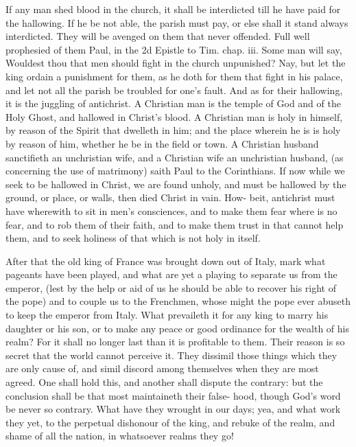 If any man shed blood in the church, it shall be interdicted
till he have paid for the hallowing. If he be not 
able, the parish must pay, or else shall it stand always interdicted.
They will be avenged on them that never 
offended. Full well prophesied of them Paul, in the 
2d Epistle to Tim. chap. iii. Some man will say, Wouldest 
thou that men should fight in the church unpunished? Nay, 
but let the king ordain a punishment for them, as he doth 
for them that fight in his palace, and let not all the parish 
be troubled for one's fault. And as for their hallowing, it 
is the juggling of antichrist. A Christian man is the 
temple of God and of the Holy Ghost, and hallowed in 
Christ's blood. A Christian man is holy in himself, by 
reason of the Spirit that dwelleth in him; and the place 
wherein he is is holy by reason of him, whether he be in 
the field or town. A Christian husband sanctifieth an 
unchristian wife, and a Christian wife an unchristian husband,
(as concerning the use of matrimony) saith Paul to 
the Corinthians. If now while we seek to be hallowed in 
Christ, we are found unholy, and must be hallowed by the 
ground, or place, or walls, then died Christ in vain. How- 
beit, antichrist must have wherewith to sit in men's consciences,
and to make them fear where is no fear, and 
to rob them of their faith, and to make them trust in 
that cannot help them, and to seek holiness of that which 
is not holy in itself. 

After that the old king of France was brought down out 
of Italy, mark what pageants have been played, and what 
are yet a playing to separate us from the emperor, (lest by 
the help or aid of us he should be able to recover his right 
of the pope) and to couple us to the Frenchmen, whose 
might the pope ever abuseth to keep the emperor from 
Italy. What prevaileth it for any king to marry his 
daughter or his son, or to make any peace or good ordinance
for the wealth of his realm? For it shall no longer 
last than it is profitable to them. Their reason is so secret 
that the world cannot perceive it. They dissimil those 
things which they are only cause of, and simil discord 
among themselves when they are most agreed. One shall 
hold this, and another shall dispute the contrary: but 
the conclusion shall be that most maintaineth their false- 
hood, though God's word be never so contrary. What 
have they wrought in our days; yea, and what work 
they yet, to the perpetual dishonour of the king, and 
rebuke of the realm, and shame of all the nation, in whatsoever
realms they go! 

